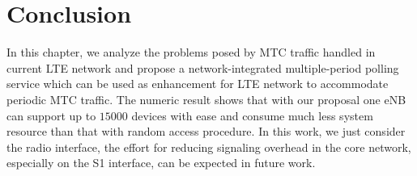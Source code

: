 \section{Conclusion}
\label{sec:conclusion}
In this chapter, we analyze the problems posed by MTC traffic handled in current LTE network and propose a network-integrated multiple-period polling service which can be used as enhancement for LTE network to accommodate periodic MTC traffic. The numeric result shows that with our proposal one eNB can support up to $15000$ devices with ease and consume much less system resource than that with random access procedure. In this work, we just consider the radio interface, the effort for reducing signaling overhead in the core network, especially on the S1 interface, can be expected in future work. 
